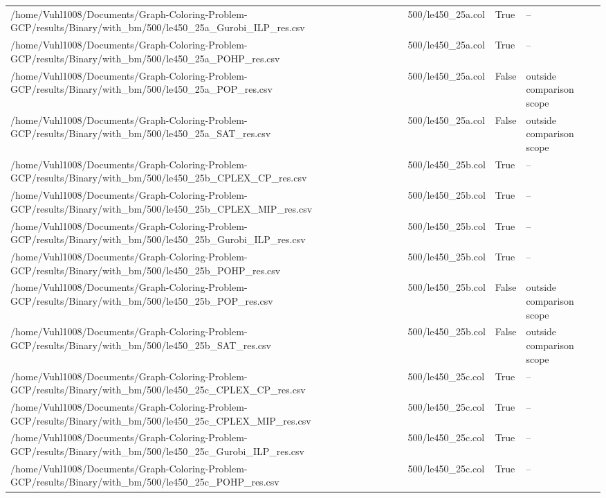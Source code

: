 \begin{table}[htbp]
\begin{tabular}{llll}
/home/Vuhl1008/Documents/Graph-Coloring-Problem-GCP/results/Binary/with\_bm/500/le450\_25a\_Gurobi\_ILP\_res.csv & 500/le450\_25a.col & True & -- \\
/home/Vuhl1008/Documents/Graph-Coloring-Problem-GCP/results/Binary/with\_bm/500/le450\_25a\_POHP\_res.csv & 500/le450\_25a.col & True & -- \\
/home/Vuhl1008/Documents/Graph-Coloring-Problem-GCP/results/Binary/with\_bm/500/le450\_25a\_POP\_res.csv & 500/le450\_25a.col & False & outside comparison scope \\
/home/Vuhl1008/Documents/Graph-Coloring-Problem-GCP/results/Binary/with\_bm/500/le450\_25a\_SAT\_res.csv & 500/le450\_25a.col & False & outside comparison scope \\
/home/Vuhl1008/Documents/Graph-Coloring-Problem-GCP/results/Binary/with\_bm/500/le450\_25b\_CPLEX\_CP\_res.csv & 500/le450\_25b.col & True & -- \\
/home/Vuhl1008/Documents/Graph-Coloring-Problem-GCP/results/Binary/with\_bm/500/le450\_25b\_CPLEX\_MIP\_res.csv & 500/le450\_25b.col & True & -- \\
/home/Vuhl1008/Documents/Graph-Coloring-Problem-GCP/results/Binary/with\_bm/500/le450\_25b\_Gurobi\_ILP\_res.csv & 500/le450\_25b.col & True & -- \\
/home/Vuhl1008/Documents/Graph-Coloring-Problem-GCP/results/Binary/with\_bm/500/le450\_25b\_POHP\_res.csv & 500/le450\_25b.col & True & -- \\
/home/Vuhl1008/Documents/Graph-Coloring-Problem-GCP/results/Binary/with\_bm/500/le450\_25b\_POP\_res.csv & 500/le450\_25b.col & False & outside comparison scope \\
/home/Vuhl1008/Documents/Graph-Coloring-Problem-GCP/results/Binary/with\_bm/500/le450\_25b\_SAT\_res.csv & 500/le450\_25b.col & False & outside comparison scope \\
/home/Vuhl1008/Documents/Graph-Coloring-Problem-GCP/results/Binary/with\_bm/500/le450\_25c\_CPLEX\_CP\_res.csv & 500/le450\_25c.col & True & -- \\
/home/Vuhl1008/Documents/Graph-Coloring-Problem-GCP/results/Binary/with\_bm/500/le450\_25c\_CPLEX\_MIP\_res.csv & 500/le450\_25c.col & True & -- \\
/home/Vuhl1008/Documents/Graph-Coloring-Problem-GCP/results/Binary/with\_bm/500/le450\_25c\_Gurobi\_ILP\_res.csv & 500/le450\_25c.col & True & -- \\
/home/Vuhl1008/Documents/Graph-Coloring-Problem-GCP/results/Binary/with\_bm/500/le450\_25c\_POHP\_res.csv & 500/le450\_25c.col & True & -- \\

\end{tabular}
\end{table}
